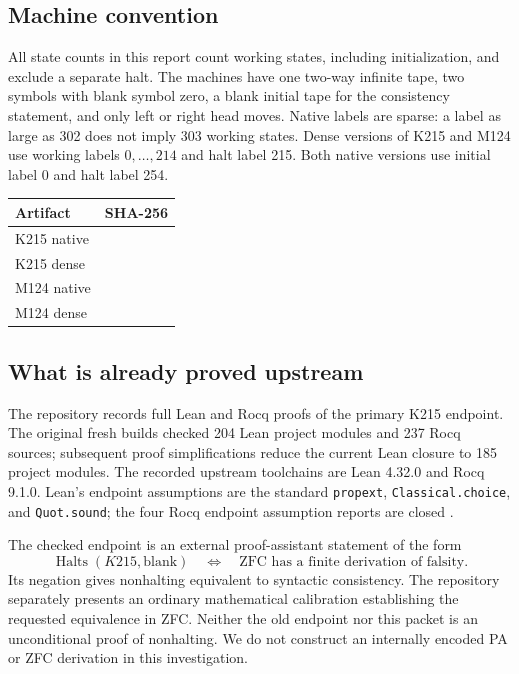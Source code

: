 \documentclass[11pt]{article}
\theoremstyle{remark}\newtheorem{remark}[theorem]{Remark}
\newcommand{\Halts}{\operatorname{Halts}}
\newcommand{\code}[1]{\texttt{\small #1}}
\begin{document}
\subsection{Machine convention}

All state counts in this report count working states, including initialization, and exclude a separate halt. The machines have one two-way infinite tape, two symbols with blank symbol zero, a blank initial tape for the consistency statement, and only left or right head moves. Native labels are sparse: a label as large as 302 does not imply 303 working states. Dense versions of K215 and M124 use working labels $0,\ldots,214$ and halt label 215. Both native versions use initial label 0 and halt label 254.

\begin{center}
\begin{tabularx}{\linewidth}{lY}
\toprule
Artifact & SHA-256 \\
\midrule
K215 native &  \\
K215 dense &  \\
M124 native &  \\
M124 dense &  \\
\bottomrule
\end{tabularx}
\end{center}

\subsection{What is already proved upstream}

The repository records full Lean and Rocq proofs of the primary K215 endpoint. The original fresh builds checked 204 Lean project modules and 237 Rocq sources; subsequent proof simplifications reduce the current Lean closure to 185 project modules. The recorded upstream toolchains are Lean 4.32.0 and Rocq 9.1.0. Lean's endpoint assumptions are the standard \code{propext}, \code{Classical.choice}, and \code{Quot.sound}; the four Rocq endpoint assumption reports are closed \cite{formal}.

The checked endpoint is an external proof-assistant statement of the form
\[
 \Halts(K215,\mathrm{blank})\quad\Longleftrightarrow\quad
 \text{ZFC has a finite derivation of falsity}.
\]
Its negation gives nonhalting equivalent to syntactic consistency. The repository separately presents an ordinary mathematical calibration establishing the requested equivalence in ZFC. Neither the old endpoint nor this packet is an unconditional proof of nonhalting. We do not construct an internally encoded PA or ZFC derivation in this investigation.
\end{document}
